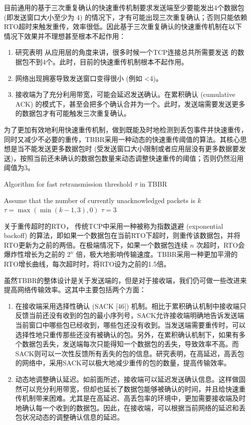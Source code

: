 \documentclass[a4paper]{article}
\begin{document}
目前通用的基于三次重复确认的快速重传机制要求发送端至少要能发出4个数据包 (即发送窗口大小至少为 4) 的情况下，才有可能出现三次重复确认；否则只能依赖RTO超时来触发重传，效率很低。因此基于三次重复确认的快速重传机制在以下
情况下效果并不理想甚至根本不起作用：
\begin{enumerate}
\item 研究表明 \cite{allman2010early} 从应用层的角度来讲，很多时候一个TCP连接总共所需要发送
的数据包不到4个。此时，目前的快速重传机制根本不起作用。
\item 网络出现拥塞导致发送窗口变得很小 (例如 <4)。
\item 接收端为了充分利用带宽，可能会延迟发送确认。在累积确认 (cumulative ACK) 的模式下，甚至会把多个确认合并为一个。此时，发送端需要发送更多的数据包才有可能触发三次重复确认。
\end{enumerate}

为了更加有效地利用快速重传机制，做到既能及时地检测到丢包事件并快速重传，同时又减少不必要的重传，TBBR采用一种动态的快速重传阈值的算法。其核心思想是当不能发送更多数据包时 (受发送窗口大小限制或者应用层没有更多数据要发送)，按照当前还未确认的数据包数量来动态调整快速重传的阈值；否则仍然沿用阈值为3。
\begin{algorithm} [hh]
\caption{Algorithm for fast retransmission threshold $\tau$ in TBBR}
\label{alg:fr}
\begin{algorithmic}[1]
\State Assume that the number of currently unacknowledged packets is $k$
\State $\tau = \max(\min(k-1,3),0)$
\Else
\State $\tau = 3$
\EndIf
\end{algorithmic}
\end{algorithm}

关于重传超时的RTO， 传统TCP中采用一种被称为指数退避 (exponential backoff) 的算法，即如果一个数据包在当前RTO下超时，则重传该数据包，并将RTO更新为之前的两倍。在极端情况下，如果一个数据包连续 $n$ 次超时，RTO会爆炸性增长为之前的 $2^n$ 倍，极大地影响传输速度。TBBR采用一种更加平滑的RTO增长曲线，每次超时时，将RTO设为之前的1.5倍。

虽然TBBR的整体设计是关于发送端的，但是对于接收端，我们仍可做一些改进来提高网络传输效率。这其中主要包括两个方面：
\begin{enumerate}
\item 在接收端采用选择性确认 (SACK [46]) 机制。相比于累积确认机制中接收端只反馈当前还没有收到的包的最小序列号，SACK允许接收端明确地告诉发送端当前窗口中哪些包已经收到，哪些包还没有收到。当发送端需要重传时，可以选择性地只重传那些还没有被确认的包。另外，在累积确认机制下，如果有多个数据包丢失，发送端每次只能得知一个数据包的丢失，导致效率不高。而SACK则可以一次性反馈所有丢失的包的信息。研究表明，在高延迟，高丢包的网络中，采用SACK可以极大地减少重传的包的数量，提高传输效率。
\item 动态地调整确认延迟。如前面所述，接收端可以延迟发送确认信息。这样做固然可以充分利用带宽，但却也延长了数据包能够被确认的时间，并且给快速重传机制带来困难。尤其是在高延迟、高丢包率的环境中，更加需要接收端及时地确认每一个收到的数据包。因此，在接收端，可以根据当前网络的延迟和丢包状况动态的调整确认信息的延迟。
\end{enumerate}
\end{document}
